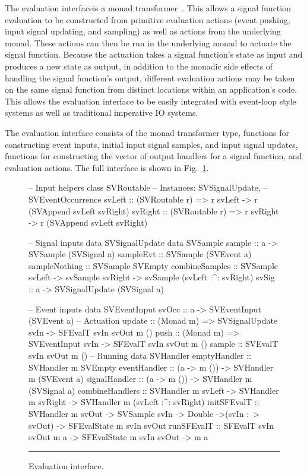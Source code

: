 \documentclass[draft]{llncs}
\begin{document}
The evaluation interfaceis a monad transformer~\cite{Liang1995}. This allows
a signal function evaluation to be constructed from primitive evaluation actions
(event pushing, input signal updating, and sampling) as well as actions from the
underlying monad. These actions can then be run in the underlying monad
to actuate the signal function. Because the actuation takes a signal function's
state as input and produces a new state as output, in addition to the monadic
side effects of handling the signal function's output, different evaluation
actions may be taken on the same signal function from distinct locations within
an application's code. This allows the evaluation interface to be easily
integrated with event-loop style systems as well as traditional imperative
IO systems.

The evaluation interface consists of the monad transformer type, functions for
constructing event inputs, initial input signal samples, and input signal
updates, functions for constructing the vector of output handlers for a signal
function, and evaluation actions. The full interface is shown in Fig.~\ref{figure:evaluation_interface}.

\begin{figure}
\begin{code}
-- Input helpers
class SVRoutable -- Instances: SVSignalUpdate,
                 -- SVEventOccurrence
svLeft :: (SVRoutable r) => 
          r svLeft -> r (SVAppend svLeft svRight)
svRight :: (SVRoutable r) =>
           r svRight -> r (SVAppend svLeft svRight)

-- Signal inputs
data SVSignalUpdate
data SVSample
sample :: a -> SVSample (SVSignal a)
sampleEvt :: SVSample (SVEvent a)
sampleNothing :: SVSample SVEmpty
combineSamples :: SVSample svLeft -> svSample svRight 
                  -> svSample (svLeft :^: svRight)
svSig :: a -> SVSignalUpdate (SVSignal a)

-- Event inputs
data SVEventInput
svOcc :: a -> SVEventInput (SVEvent a)
-- Actuation
update :: (Monad m) => SVSignalUpdate svIn 
           -> SFEvalT svIn svOut m ()
push   :: (Monad m) => SVEventInput svIn
          -> SFEvalT svIn svOut m ()
sample :: SVEvalT svIn svOut m ()
-- Running
data SVHandler
emptyHandler :: SVHandler m SVEmpty
eventHandler :: (a -> m ()) 
                -> SVHandler m (SVEvent a)
signalHandler :: (a -> m ()) 
                 -> SVHandler m (SVSignal a)
combineHandlers :: SVHandler m svLeft
                   -> SVHandler m svRight
                   -> SVHandler m (svLeft :^: svRight)
initSFEvalT :: SVHandler m svOut -> SVSample svIn 
               -> Double ->(svIn :~> svOut)
               -> SFEvalState m svIn svOut
runSFEvalT :: SFEvalT svIn svOut m a
              -> SFEvalState m svIn svOut
              -> m a
\end{code}
\hrule
\caption{Evaluation interface.}
\label{figure:evaluation_interface}
\end{figure}
\end{document}
